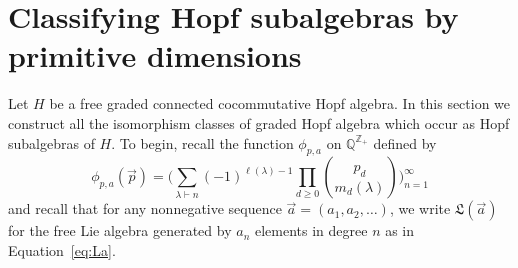 \documentclass[11pt]{amsart}
\theoremstyle{definition}
\numberwithin{equation}{section}
\def\CC{{\mathbb C}}
\def\ZZ{{\mathbb Z}}
\def\QQ{{\mathbb Q}}
\newcommand{\mike}[1]{\todo[size=\tiny,color=green!30]{#1 \\ \hfill --- Mike}}
\newcommand{\lucas}[1]{\todo[size=\tiny,color=red!50]{#1 \\ \hfill --- Lucas}}
\begin{document}
%



\section{Classifying Hopf subalgebras by primitive dimensions}

Let $H$ be a free graded connected cocommutative Hopf algebra.  
In this section we construct all the isomorphism classes of graded Hopf algebra which occur as Hopf subalgebras of $H$.
To begin, recall the function $\phi_{p, a}$ on $\QQ^{\ZZ_+}$ defined by
\[
\phi_{p, a}(\vec{p}) = \big( \sum_{\lambda \vdash n} (-1)^{\ell(\lambda) - 1} \prod_{d \ge 0} \binom{p_{d}}{m_{d}(\lambda)} \big)_{n = 1}^{\infty}
\]
and recall that for any nonnegative sequence $\vec{a} = (a_{1}, a_{2}, \ldots)$, we write $\mathfrak{L}(\vec{a})$ for the free Lie algebra generated by $a_{n}$ elements in degree $n$ as in Equation~\eqref{eq:La}.
\end{document}
